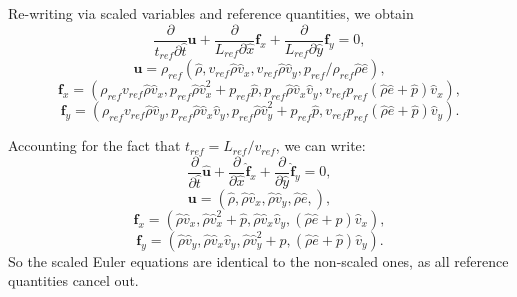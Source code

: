 \documentclass[a4paper,11pt,english]{article}
\begin{document}
Re-writing via scaled variables and reference quantities, we obtain
\begin{equation}
    \frac{\partial}{t_{ref}  \partial \hat{t}}\mathbf{u} + \frac{\partial}{L_{ref} \partial \hat{x}}\mathbf{f}_x + \frac{\partial}{L_{ref}\partial  \hat{y}}\mathbf{f}_y = 0,
\end{equation}
\begin{equation}
     \mathbf{u} = \rho_{ref}\left( \hat{\rho},
     v_{ref} \hat{\rho} \hat{v}_x,
     v_{ref} \hat{\rho} \hat{v}_y,
     p_{ref} / \rho_{ref} \hat{\rho}\hat{e} \right),
\end{equation}
\begin{equation}
     \mathbf{f}_x = \left(\rho_{ref} v_{ref}  \hat{\rho} \hat{v}_x,
     p_{ref} \hat{\rho} \hat{v}_x^2 + p_{ref}\hat{p},
     p_{ref} \hat{\rho} \hat{v}_x \hat{v}_y,
     v_{ref}  p_{ref}(\hat{\rho}\hat{e}+\hat{p})\hat{v}_x \right),
\end{equation}
\begin{equation}
     \mathbf{f}_y = \left(\rho_{ref} v_{ref} \hat{\rho} \hat{v}_y,
     p_{ref} \hat{\rho} \hat{v}_x \hat{v}_y,
     p_{ref} \hat{\rho} \hat{v}_y^2 + p_{ref}\hat{p}, 
     v_{ref} p_{ref}(\hat{\rho}\hat{e}+\hat{p})\hat{v}_y \right).
\end{equation}

Accounting for the fact that $t_{ref}=L_{ref}/v_{ref}$, we can write:
\begin{equation}
    \frac{\partial}{\partial \hat{t}}\hat{\mathbf{u}} + \frac{\partial}{\partial \hat{x}}\hat{\mathbf{f}}_x + \frac{\partial}{\partial  \hat{y}}\hat{\mathbf{f}}_y = 0,
\end{equation}
\begin{equation}
     \mathbf{u} = \left(\hat{\rho},
     \hat{\rho} \hat{v}_x,
     \hat{\rho} \hat{v}_y,
     \hat{\rho}\hat{e},
     \right),
\end{equation}
\begin{equation}
     \mathbf{f}_x = \left(\hat{\rho} \hat{v}_x,
     \hat{\rho} \hat{v}_x^2 + \hat{p},
     \hat{\rho} \hat{v}_x \hat{v}_y,
     (\hat{\rho}\hat{e} + \hat{p})\hat{v}_x
     \right),
\end{equation}
\begin{equation}
     \mathbf{f}_y = \left(\hat{\rho} \hat{v}_y,
     \hat{\rho} \hat{v}_x \hat{v}_y,
     \hat{\rho} \hat{v}_y^2 + \hat{p}, 
     (\hat{\rho}\hat{e}+\hat{p})\hat{v}_y
     \right).
\end{equation}
So the scaled Euler equations are identical to the non-scaled ones, as all reference quantities cancel out.
\end{document}
